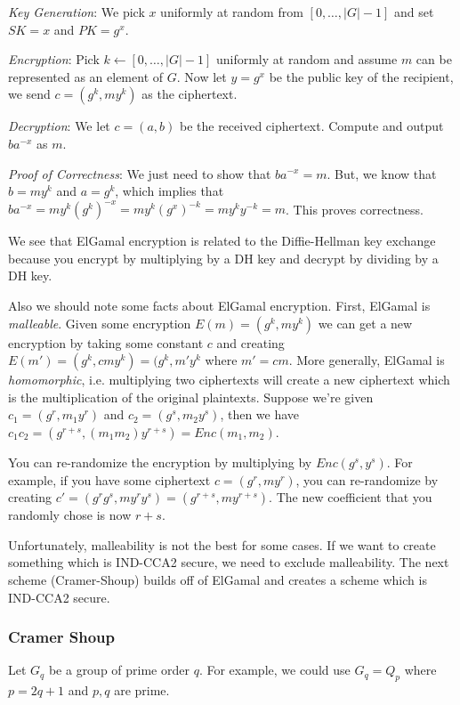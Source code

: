 \documentclass[psamsfonts]{amsart}
\begin{document}
\emph{Key Generation}: We pick $x$ uniformly at random from $[0, \ldots, |G|-1]$ and set $SK = x$ and $PK = g^x$.

\emph{Encryption}: Pick $k \leftarrow [0, \ldots, |G|-1]$ uniformly at random and assume $m$ can be represented as an element of $G$. Now let $y = g^x$ be the public key of the recipient, we send $c = (g^k, m y^k)$ as the ciphertext.

\emph{Decryption}: We let $c = (a,b)$ be the received ciphertext. Compute and output $b a^{-x}$ as $m$.

\emph{Proof of Correctness}: We just need to show that $b a^{-x} = m$. But, we know that $b = m y^k$ and $a = g^k$, which implies that $b a^{-x} = m y^k (g^k)^{-x} = m y^k (g^x)^{-k} = m y^k y^{-k} = m$. This proves correctness.

We see that ElGamal encryption is related to the Diffie-Hellman key exchange because you encrypt by multiplying by a DH key and decrypt by dividing by a DH key.

Also we should note some facts about ElGamal encryption. First, ElGamal is \emph{malleable}. Given some encryption $E(m) = (g^k, m y^k)$ we can get a new encryption by taking some constant $c$ and creating $E(m') = (g^k, c m y^k) = (g^k, m' y^k$ where $m' = c m$. More generally, ElGamal is \emph{homomorphic}, i.e. multiplying two ciphertexts will create a new ciphertext which is the multiplication of the original plaintexts. Suppose we're given $c_1 = (g^r, m_1 y^r)$ and $c_2 = (g^s, m_2 y^s)$, then we have $c_1 c_2 = (g^{r+s}, (m_1 m_2) y^{r+s}) = Enc(m_1, m_2)$.

You can re-randomize the encryption by multiplying by $Enc(g^s, y^s)$. For example, if you have some ciphertext $c = (g^r, m y^r)$, you can re-randomize by creating $c' = (g^r g^s, m y^r y^s) = (g^{r+s}, m y^{r+s})$. The new coefficient that you randomly chose is now $r+s$.

Unfortunately, malleability is not the best for some cases. If we want to create something which is IND-CCA2 secure, we need to exclude malleability. The next scheme (Cramer-Shoup) builds off of ElGamal and creates a scheme which is IND-CCA2 secure.

\subsubsection{Cramer Shoup}

Let $G_q$ be a group of prime order $q$. For example, we could use $G_q = Q_p$ where $p = 2q+1$ and $p,q$ are prime.
\end{document}
